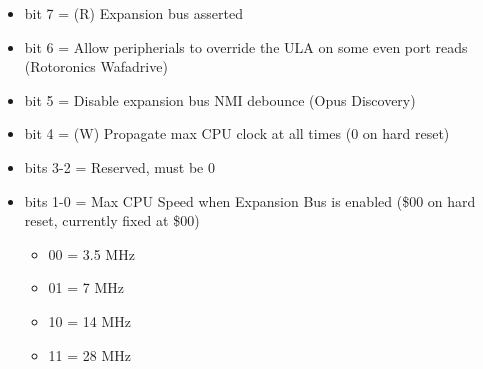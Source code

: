 \begin{itemize}
\item bit 7 = (R) Expansion bus  asserted
\item bit 6 = Allow peripherials to override the ULA on some even
  port reads (Rotoronics Wafadrive)
\item bit 5 = Disable expansion bus NMI debounce (Opus Discovery)
\item bit 4 = (W) Propagate max CPU clock at all times (0 on hard
  reset)
\item bits 3-2 = Reserved, must be 0
\item bits 1-0 = Max CPU Speed when Expansion Bus is enabled (\$00 on
  hard reset, currently fixed at \$00)
  \begin{itemize}
  \item 00 = 3.5 MHz
  \item 01 = 7 MHz
  \item 10 = 14 MHz
  \item 11 = 28 MHz
  \end{itemize}
\end{itemize}

